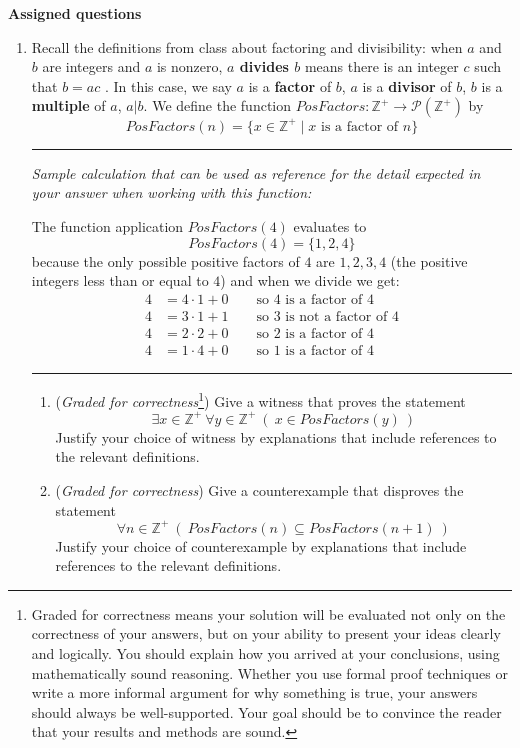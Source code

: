 \documentclass[12pt, oneside]{article}
\begin{document}
\newpage
{\bf Assigned questions}

\begin{enumerate}
   \item Recall the definitions from class about factoring and divisibility:
   when $a$ and $b$ are integers and $a$ is nonzero, 
   {\bf $a$ divides $b$} means there is an integer $c$ such that $b = ac$ . 
   In this case, we say $a$ is a {\bf factor} of $b$, $a$ is a {\bf divisor} of $b$, 
   $b$ is a {\bf multiple} of $a$, 
   $a | b$.  We define the function 
   $PosFactors: \mathbb{Z}^+ \to \mathcal{P}(\mathbb{Z}^+)$ by 
   \[
        PosFactors (n) = \{ x \in \mathbb{Z}^+ \mid x\text{ is a factor of } n\}
   \]

   \rule{0.5\textwidth}{.4pt}

   {\it Sample calculation that can be used as reference for the detail expected 
   in your answer when working with this function:} 
   
   The function application $PosFactors(4)$ evaluates to 
   \[
       PosFactors (4) = \{ 1,2,4\}
   \]
   because the only possible positive factors of $4$ are $1,2,3,4$ (the positive integers less than 
   or equal to $4$) and when we divide we get:
   \begin{align*}
        4 &= 4 \cdot 1 + 0 \qquad \text{so $4$ is a factor of $4$}\\
        4 &= 3 \cdot 1 + 1 \qquad \text{so $3$ is not a factor of $4$}\\
        4 &= 2 \cdot 2 + 0 \qquad \text{so $2$ is a factor of $4$}\\
        4 &= 1 \cdot 4 + 0 \qquad \text{so $1$ is a factor of $4$}
   \end{align*}

   \rule{0.5\textwidth}{.4pt}

   \begin{enumerate}
     \item ({\it Graded for correctness}\footnote{Graded for correctness means your solution will be
     evaluated not only on the correctness of your answers, but on your ability to 
     present your ideas clearly and logically. You should explain how you arrived at your conclusions, using 
     mathematically sound reasoning. Whether you use formal proof techniques or write a more informal argument for why 
     something is true, your answers should always be well-supported. Your goal should be to convince the reader that 
     your results and methods are sound.}) Give a witness that proves the statement 
     \[
         \exists x \in \mathbb{Z}^+ ~\forall y \in \mathbb{Z}^+ ~\left(~x \in PosFactors(y)~\right)
     \]
     Justify your choice of witness by explanations that include references to the relevant definitions.
     \item ({\it Graded for correctness}) Give a counterexample that disproves the statement 
     \[
         \forall n \in \mathbb{Z}^+ ~\left(~ PosFactors(n) \subseteq PosFactors(n+1)~\right)
     \]
     Justify your choice of counterexample by explanations that include references to the relevant definitions.
    

\end{enumerate}
\end{enumerate}
\end{document}
